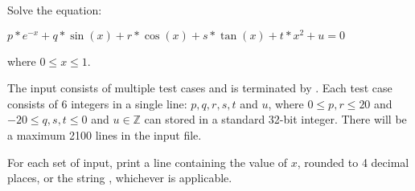 
\begin{problem}

Solve the equation:
\begin{center}
$p*e^{-x} + q*\sin(x) + r*\cos(x) + s*\tan(x) + t * x^2 + u = 0$ 
\end{center}
where $0 \le x \le 1$.
\end{problem}

\begin{inputdescription}
The input consists of multiple test cases and is terminated by . Each test case consists of 6 integers in a single line: $p,q,r,s,t$ and $u$, where $0 \le p,r \le 20$ and $-20 \le q,s,t \le 0$ and $u \in \mathbb{Z}$ can stored in a standard 32-bit integer. There will be a maximum 2100 lines in the input file.
\end{inputdescription}

\begin{outputdescription}
For each set of input, print a line containing the value of $x$, rounded to 4 decimal places, or the string , whichever is applicable.
\end{outputdescription}

